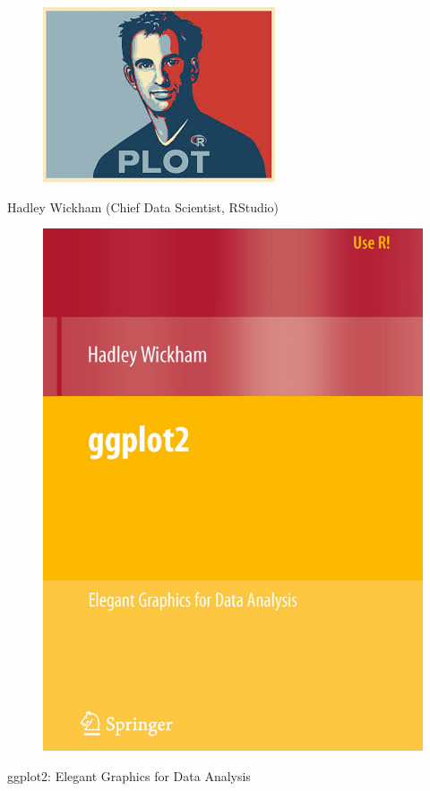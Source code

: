 \documentclass{beamer}
\begin{document}
\begin{frame}
	\begin{figure}
\centering
\includegraphics[width=0.95\linewidth]{HW}

\end{figure}
Hadley Wickham (Chief Data Scientist, RStudio)
\end{frame}

\begin{frame}
\begin{figure}
\centering
\includegraphics[width=0.55\linewidth]{ggplot2-bookcover}
\end{figure}
ggplot2: Elegant Graphics for Data Analysis
\end{frame}
\end{document}
